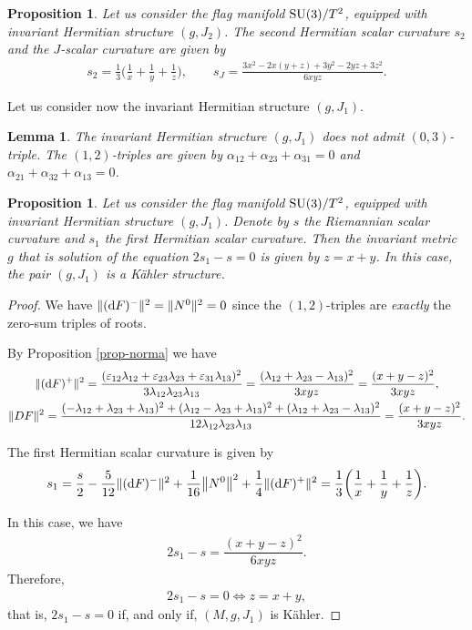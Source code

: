 \documentclass[pdftex]{sigma}%
\numberwithin{equation}{section}
\newtheorem{Lemma}[Theorem]{Lemma}
\newtheorem{Proposition}[Theorem]{Proposition}
 { \theoremstyle{definition}
\newtheorem{Definition}[Theorem]{Definition}
\newtheorem{Question}[Theorem]{Question}
\newtheorem*{Notation}{Notation}
\newtheorem{Example}[Theorem]{Example}
\newtheorem{Remark}[Theorem]{Remark} }
\begin{document}
\begin{Proposition}
Let us consider the flag manifold ${\rm SU}(3)/T^2$, equipped with invariant Hermitian structure $(g, J_{2})$. The second Hermitian scalar curvature $s_2$ and the $J$-scalar curvature are given by
\begin{gather*}
s_{2}=\frac{1}{3} \bigg(\frac{1}{x}+\frac{1}{y}+\frac{1}{z}\bigg),
\qquad
s_{J}=\frac{3 x^2-2 x (y+z)+3 y^2-2 y z+3 z^2}{6 x y z}.
\end{gather*}
\end{Proposition}

Let us consider now the invariant Hermitian structure $(g, J_{1})$.

\begin{Lemma}
The invariant Hermitian structure $(g, J_{1})$ does not admit $(0,3)$-triple. The $(1,2)$-triples are given by $\alpha_{12}+\alpha_{23}+\alpha_{31}=0$ and $\alpha_{21}+\alpha_{32}+\alpha_{13}=0$.
\end{Lemma}

\begin{Proposition}\label{prop-su3-j1}
Let us consider the flag manifold ${\rm SU}(3)/T^2$, equipped with invariant Hermitian structure $(g, J_{1})$. Denote by $s$ the Riemannian scalar curvature and $s_1$ the first Hermitian scalar curvature. Then the invariant metric $g$ that is solution of the equation $2s_1-s=0$ is given by $z=x+y$. In this case, the pair $(g, J_{1})$ is a K\"ahler structure.
\end{Proposition}
\begin{proof}
We have $\|({\rm d}F)^{-}\|^{2}=\|N^0\|^{2}=0$ since the $(1,2)$-triples are {\it exactly} the zero-sum triples of roots.

By Proposition \ref{prop-norma} we have
\begin{gather*}
\|({\rm d}F)^{+}\|^{2}=\dfrac{(\varepsilon_{12}\lambda_{12}+\varepsilon_{23}\lambda_{23} +\varepsilon_{31}\lambda_{13})^{2}}{3\lambda_{12}\lambda_{23}\lambda_{13}} =\dfrac{(\lambda_{12}+\lambda_{23}-\lambda_{13})^{2}}{3xyz}
=\dfrac{(x+y-z)^{2}}{3xyz},
\\
\|DF\|^2=\dfrac{(-\lambda_{12}+\lambda_{23}+\lambda_{13})^2+(\lambda_{12}-\lambda_{23} +\lambda_{13})^2+(\lambda_{12}+\lambda_{23}-\lambda_{13})^2}{12 \lambda_{12}\lambda_{23}\lambda_{13}}
=\dfrac{(x+y-z)^{2}}{3xyz}.
\end{gather*}

The first Hermitian scalar curvature is given by
\begin{align*}
s_{1}=\dfrac{s}{2}-\dfrac{5}{12}\|({\rm d}F)^{-}\|^{2}+\dfrac{1}{16}\big\|N^{0}\big\|^{2}+\dfrac{1}{4}\|({\rm d}F)^{+}\|^{2}
=\dfrac{1}{3}\bigg(\dfrac{1}{x}+\dfrac{1}{y}+\dfrac{1}{z}\bigg).
\end{align*}

In this case, we have
\begin{gather*}
2s_{1}-s=\dfrac{(x+y-z)^{2}}{6xyz}.
\end{gather*}
Therefore,
\begin{gather*}
2s_{1}-s=0\Leftrightarrow z=x+y,
\end{gather*}
that is, $2s_{1}-s=0$ if, and only if, $(M,g,J_1)$ is K\"ahler.
\end{proof}
\end{document}

